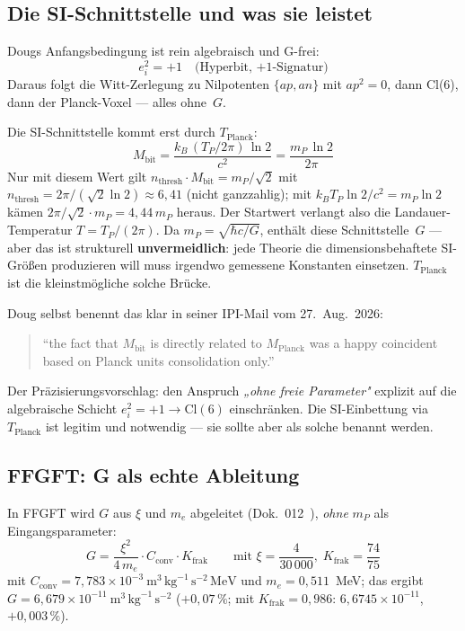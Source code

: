 \subsection{Die SI-Schnittstelle und was sie leistet}

Dougs Anfangsbedingung ist rein algebraisch und G-frei:
\begin{equation}
  e_i^2 = +1 \quad\text{(Hyperbit, $+1$-Signatur)}
\end{equation}
Daraus folgt die Witt-Zerlegung zu Nilpotenten $\{ap, an\}$ mit $ap^2=0$,
dann Cl(6), dann der Planck-Voxel --- alles ohne~$G$.

Die SI-Schnittstelle kommt erst durch $T_\text{Planck}$:
\begin{equation}
  M_\text{bit} = \frac{k_B\,(T_P/2\pi)\,\ln 2}{c^2} = \frac{m_P\,\ln 2}{2\pi}
\end{equation}
Nur mit diesem Wert gilt $n_\text{thresh}\cdot M_\text{bit} = m_P/\sqrt2$ mit
$n_\text{thresh} = 2\pi/(\sqrt2\ln2)\approx6{,}41$ (nicht ganzzahlig); mit
$k_B T_P\ln2/c^2 = m_P\ln2$ kämen $2\pi/\sqrt2\cdot m_P = 4{,}44\,m_P$ heraus.
Der Startwert verlangt also die Landauer-Temperatur $T = T_P/(2\pi)$.
Da $m_P = \sqrt{\hbar c/G}$, enthält diese Schnittstelle~$G$ ---
aber das ist strukturell \textbf{unvermeidlich}: jede Theorie die
dimensionsbehaftete SI-Größen produzieren will muss irgendwo
gemessene Konstanten einsetzen. $T_\text{Planck}$ ist die
kleinstmögliche solche Brücke.

Doug selbst benennt das klar in seiner IPI-Mail vom 27.~Aug.~2026:
\begin{quote}
``the fact that $M_\text{bit}$ is directly related to $M_\text{Planck}$
was a happy coincident based on Planck units consolidation only.''
\end{quote}

Der Präzisierungsvorschlag: den Anspruch \emph{„ohne freie Parameter"}
explizit auf die algebraische Schicht $e_i^2=+1\to\text{Cl}(6)$ einschränken.
Die SI-Einbettung via $T_\text{Planck}$ ist legitim und notwendig ---
sie sollte aber als solche benannt werden.

\subsection{FFGFT: G als echte Ableitung}

In FFGFT wird $G$ aus $\xi$ und $m_e$ abgeleitet (Dok.~012~\cite{Pascher012}),
\emph{ohne} $m_P$ als Eingangsparameter:
\begin{equation}
  G = \frac{\xi^2}{4\,m_e}\cdot C_\text{conv}\cdot K_\text{frak}
  \qquad \text{mit } \xi = \frac{4}{30\,000},\; K_\text{frak} = \frac{74}{75}
\end{equation}
mit $C_\text{conv} = 7{,}783\times10^{-3}\ \text{m}^3\,\text{kg}^{-1}\,\text{s}^{-2}\,\text{MeV}$
und $m_e = 0{,}511$~MeV; das ergibt $G = 6{,}679\times10^{-11}\ \text{m}^3\,\text{kg}^{-1}\,\text{s}^{-2}$
($+0{,}07\,\%$; mit $K_\text{frak} = 0{,}986$: $6{,}6745\times10^{-11}$, $+0{,}003\,\%$).


